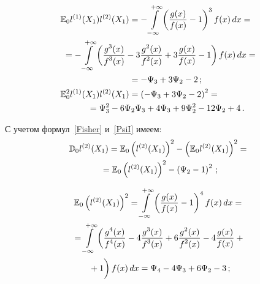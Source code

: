 \begin{multicols}{2}
\noindent
\begin{align*}
\!\E_0 l^{(1)}(X_1)l^{(2)}(X_1)&=-\int\limits_{-\infty}^{+\infty}
\left(\fr{g(x)}{f(x)}-1\right)^3f(x)\,dx={}\hspace*{-1.25272pt}\\
&\hspace*{-27mm}{}=-\int\limits_{-\infty}^{+\infty}\left(\fr{g^3(x)}{f^3(x)}-3\fr{g^2(x)}{f^2(x)}
+3\fr{g(x)}{f(x)}-1\right)f(x)\,dx={}\\
&{}=-\Psi_3+3\Psi_2-2\,;\\
\E_0^2l^{(1)}(X_1)l^{(2)}(X_1)&=\left(-\Psi_3+3\Psi_2-2\right)^2={}\\
&\hspace*{-17mm}{}=\Psi_3^2-6\Psi_2\Psi_3+4\Psi_3+9\Psi_2^2-12\Psi_2+4\,.
\end{align*}


\noindent
С учетом формул~\eqref{Fisher} и~\eqref{PsiI} имеем:
\begin{multline*}
\mathbb D_0
l^{(2)}(X_1)=\mathbb E_0\left(l^{(2)}(X_1)\right)^2-\left(\mathbb E_0l^{(2)}(X_1)\right)^2={}\\
{}=\mathbb E_0\left(l^{(2)}(X_1)\right)^2-\left(\Psi_2-1\right)^2\,;
\end{multline*}

\vspace*{-6pt}

\noindent
\begin{multline*}
\E_0\left(l^{(2)}(X_1)\right)^2=\int\limits_{-\infty}^{+\infty}\left(
\fr{g(x)}{f(x)}-1\right)^4f(x)\,dx={}\\
{}=\int\limits_{-\infty}^{+\infty}\left(\fr{g^4(x)}{f^4(x)}-4\fr{g^3(x)}{f^3(x)}
+6\fr{g^2(x)}{f^2(x)}-4\fr{g(x)}{f(x)}+{}\right.\\
\left.{}+1
\vphantom{\fr{g^2(x)}{f^2(x)}}\right)f(x)\,dx
=\Psi_4-4\Psi_3+6\Psi_2-3\,;
\end{multline*}


\end{multicols}
